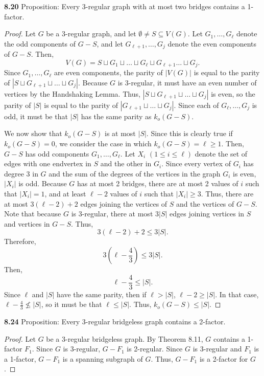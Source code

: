 \documentclass[12pt]{article}
\begin{document}
\newpage\noindent\textbf{8.20} Proposition: Every 3-regular graph with at most two bridges contains a 1-factor.
\begin{proof}
    Let $G$ be a 3-regular graph, and let $\emptyset \neq S \subseteq V(G)$.
    Let $G_1, \hdots, G_\ell$ denote the odd components of $G-S$, and let $G_{\ell+1}, \hdots, G_j$ denote the even components of $G-S$.
    Then, $$V(G) = S \sqcup G_1 \sqcup \hdots \sqcup G_{\ell} \sqcup G_{\ell+1} \hdots \sqcup G_j.$$
    Since $G_1, \hdots, G_{\ell}$ are even components, the parity of $|V(G)|$ is equal to the parity of $|S \sqcup G_{\ell+1} \sqcup \hdots \sqcup G_j|$.
    Because $G$ is 3-regular, it must have an even number of vertices by the Handshaking Lemma.
    Thus, $|S \sqcup G_{\ell+1} \sqcup \hdots \sqcup G_j|$ is even, so the parity of $|S|$ is equal to the parity of $|G_{\ell+1} \sqcup \hdots \sqcup G_j|$.
    Since each of $G_\ell, \hdots, G_j$ is odd, it must be that $|S|$ has the same parity as $k_o(G - S)$.

    We now show that $k_o(G - S)$ is at most $|S|$.
    Since this is clearly true if $k_o(G - S) = 0$, we consider the case in which $k_o(G-S) = \ell \geq 1$.
    Then, $G-S$ has odd components $G_1, \hdots, G_{\ell}$.
    Let $X_i$ $(1 \leq i \leq \ell)$ denote the set of edges with one endvertex in $S$ and the other in $G_i$.
    Since every vertex of $G_i$ has degree 3 in $G$ and the sum of the degrees of the vertices in the graph $G_i$ is even, $|X_i|$ is odd.
    Because $G$ has at most 2 bridges, there are at most 2 values of $i$ such that $|X_i| = 1$, and at least $\ell - 2$ values of $i$ such that $|X_i| \geq 3$.
    Thus, there are at most $3(\ell - 2) + 2$ edges joining the vertices of $S$ and the vertices of $G-S$.
    Note that because $G$ is 3-regular, there at most $3|S|$ edges joining vertices in $S$ and vertices in $G-S$.
    Thus, $$3(\ell - 2) + 2 \leq 3|S|.$$
    Therefore, $$3\left(\ell - \frac43\right) \leq 3|S|.$$
    Then, $$\ell - \frac43 \leq |S|.$$
    Since $\ell$ and $|S|$ have the same parity, then if $\ell > |S|$, $\ell - 2 \geq |S|$.
    In that case, $\ell - \frac43 \not\leq |S|$, so it must be that $\ell \leq |S|$.
    Thus, $k_o(G-S) \leq |S|$.
\end{proof}

\newpage\noindent\textbf{8.24} Proposition: Every 3-regular bridgeless graph contains a 2-factor.
\begin{proof}
    Let $G$ be a 3-regular bridgeless graph.
    By Theorem 8.11, $G$ contains a 1-factor $F_1$.
    Since $G$ is 3-regular, $G-F_1$ is 2-regular.
    Since $G$ is 3-regular and $F_1$ is a 1-factor, $G-F_1$ is a spanning subgraph of $G$.
    Thus, $G-F_1$ is a 2-factor for $G$.
\end{proof}
\end{document}
